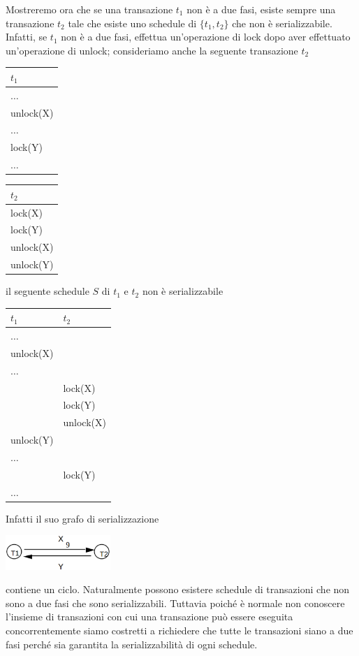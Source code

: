 Mostreremo ora che se una transazione $t_1$ non è a due fasi, esiste sempre una transazione $t_2$ tale
che esiste uno schedule di $\{t_1, t_2\}$ che non è serializzabile. Infatti, se $t_1$ non è a due fasi, effettua
un'operazione di lock dopo aver effettuato un'operazione di unlock; consideriamo anche la seguente transazione $t_2$  

\begin{multicols}{2}  

 \begin{tabular}{|l|}
   \hline
   $t_1$\\
   \hline
   $\ldots$\\
   unlock(X)\\ 
   $\ldots$\\
   lock(Y)\\ 
   $\ldots$\\
  \hline
 \end{tabular}
 
 \begin{tabular}{|l|}
  \hline
   $t_2$\\
   \hline
   lock(X)\\
   lock(Y)\\
   unlock(X)\\
   unlock(Y)\\
  \hline
  
  \end{tabular} 
 \end{multicols}

 il seguente schedule $S$ di $t_1$ e $t_2$ non è serializzabile
\begin{center}
 \begin{tabular}{|l|l|}
 \hline
 $t_1$ & $t_2$\\
 \hline
   $\ldots$&\\
   unlock(X)&\\
   $\ldots$&\\
   &lock(X)\\
   &lock(Y)\\
   &unlock(X)\\    
   unlock(Y)&\\
   $\ldots$&\\
   &lock(Y)\\
   $\ldots$&\\
   \hline
  \end{tabular}
\end{center}

Infatti il suo grafo di serializzazione
\begin{center}
  \includegraphics[width=150px]{img_6_3_1.eps}
\end{center}
contiene un ciclo. Naturalmente possono esistere schedule di transazioni che non sono a due fasi
che sono serializzabili. Tuttavia poiché è normale non conoscere l'insieme di transazioni con cui
una transazione può essere eseguita concorrentemente siamo costretti a richiedere che tutte le
transazioni siano a due fasi perché sia garantita la serializzabilità di ogni schedule.

